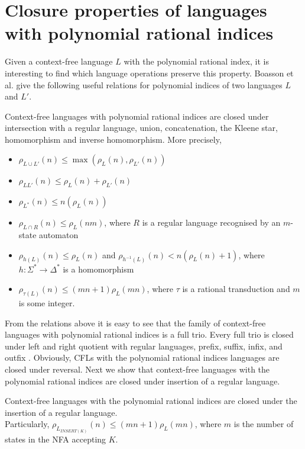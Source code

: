 \section{Closure properties of languages with polynomial rational indices}
\label{sec:closure}
Given a context-free language $L$ with the polynomial rational index, it is interesting to find which language operations preserve this property.  Boasson et al. \cite{RatBasic} give the following useful relations for polynomial indices of two languages $L$ and $L'$.
\begin{lemma}
\label{lem:closure}
Context-free languages with polynomial rational indices are closed under intersection with a regular language, union, concatenation, the Kleene star, homomorphism and inverse homomorphism. More precisely,
\begin{itemize}
\item $\rho_{L \cup L'}(n) \le  \max{(\rho_L(n), \rho_{L'}(n))} $
\item $\rho_{LL'}(n) \le \rho_L(n) + \rho_{L'}(n)$
\item $\rho_{L^{*}}(n) \le n(\rho_L(n))$
\item $\rho_{L \cap R}(n) \le \rho_L(nm)$, where $R$ is a regular language recognised by an $m$-state automaton
\item $\rho_{h(L)}(n) \le \rho_L(n)$ and $\rho_{h^{-1}(L)}(n) < n(\rho_L(n) +1)$, where $h: \Sigma^* \rightarrow \Delta^*$ is a homomorphism
\item $\rho_{\tau(L)}(n) \le (mn + 1)\rho_L(mn)$, where $\tau$ is a rational transduction and $m$ is some integer.
\end{itemize}
\end{lemma}
 From the relations above it is easy to see that the family of context-free languages with polynomial rational indices is a full trio. Every full trio is closed under left and right quotient with regular languages, prefix, suffix, infix, and outfix \cite{GinsburgAlgebraic}. Obviously, CFLs with the polynomial rational indices languages are closed under reversal.  Next we show that context-free languages with the polynomial rational indices are closed under insertion of a regular language.
\begin{theorem}
Context-free languages with the polynomial rational indices are closed under the insertion of a regular language. 
\\Particularly, $\rho_{L_{INSERT(K)}}(n) \le (mn + 1)\rho_L(mn)$, where $m$ is the number of states in the NFA accepting $K$.
\end{theorem}
